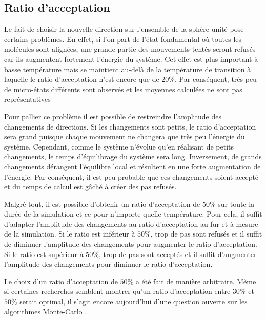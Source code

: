\documentclass[11pt]{article}
\numberwithin{equation}{section}
\begin{document}
\subsection{Ratio d'acceptation}
Le fait de choisir la nouvelle direction sur l'ensemble de la sphère unité pose certains problèmes. En effet, si l'on part de l'état fondamental où toutes les molécules sont alignées, une grande partie des mouvements tentés seront refusés car ils augmentent fortement l'énergie du système. Cet effet est plus important à basse température mais se maintient au-delà de la température de transition à laquelle le ratio d'acceptation n'est encore que de $20\%$. Par conséquent, très peu de micro-états différents sont observés et les moyennes calculées ne sont pas représentatives
\medskip

Pour pallier ce problème il est possible de restreindre l'amplitude des changements de directions. Si les changements sont petits, le ratio d'acceptation sera grand puisque chaque mouvement ne changera que très peu l'énergie du système. Cependant, comme le système n'évolue qu'en réalisant de petits changements, le temps d'équilibrage du système sera long. Inversement, de grands changements dérangent l'équilibre local et résultent en une forte augmentation de l'énergie. Par conséquent, il est peu probable que ces changements soient accepté et du temps de calcul est gâché à créer des pas refusés.
\medskip

Malgré tout, il est possible d'obtenir un ratio d'acceptation de $50\%$ sur toute la durée de la simulation et ce pour n'importe quelle température. Pour cela, il suffit d'adapter l'amplitude des changements au ratio d'acceptation au fur et à mesure de la simulation. Si le ratio est inférieur à $50\%$, trop de pas sont refusés et il suffit de diminuer l'amplitude des changements pour augmenter le ratio d'acceptation. Si le ratio est supérieur à $50\%$, trop de pas sont acceptés et il suffit d'augmenter l'amplitude des changements pour diminuer le ratio d'acceptation. 
\medskip

Le choix d'un ratio d'acceptation de $50\%$ a été fait de manière arbitraire. Même si certaines recherches \cite{acceptanceratio} semblent montrer qu'un ratio d'acceptation entre $30\%$ et $50\%$ serait optimal, il s'agit encore aujourd'hui d'une question ouverte sur les algorithmes Monte-Carlo \cite{acceptanceratio1}.
\end{document}
